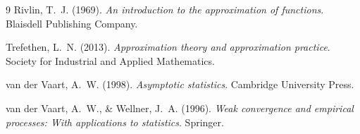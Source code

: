 \documentclass[11pt]{article}
\theoremstyle{plain}
\theoremstyle{definition}
\begin{document}
\begin{thebibliography}{9}
Rivlin, T.~J. (1969). \emph{An introduction to the approximation of
functions}. Blaisdell Publishing Company.

Trefethen, L.~N. (2013). \emph{Approximation theory and approximation
practice}. Society for Industrial and Applied Mathematics.

van der Vaart, A.~W. (1998). \emph{Asymptotic statistics}. Cambridge
University Press.

van der Vaart, A.~W., \& Wellner, J.~A. (1996). \emph{Weak convergence
and empirical processes: With applications to statistics}. Springer.
\end{thebibliography}
\end{document}
